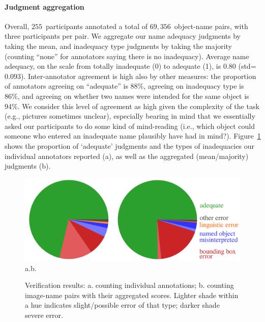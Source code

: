 \paragraph{Judgment aggregation}
Overall, $255$~participants annotated a total of $69,356$~object-name pairs, with three participants per pair.
We aggregate our name adequacy judgments by taking the mean, and inadequacy type judgments by taking the majority (counting ``none'' for annotators saying there is no inadequacy). 
Average name adequacy, on the scale from totally inadequate (0) to adequate (1), is 0.80 (\mbox{std=$0.093$}).
Inter-annotator agreement is high also by other measures: the proportion of annotators agreeing on ``adequate'' is 88\%, agreeing on inadequacy type is 86\%, and agreeing on whether two names were intended for the same object is 94\%.
We consider this level of agreement as high given the complexity of the task (e.g., pictures sometimes unclear), especially bearing in mind that we essentially asked our participants to do some kind of mind-reading (i.e., which object could someone who entered an inadequate name plausibly have had in mind?).
Figure~\ref{fig:verification-piechart} shows the proportion of `adequate' judgments and the types of inadequacies our individual annotators reported (a), as well as the aggregated (mean/majority) judgments (b).
\begin{figure}[t]
	\centering
	\includegraphics[width=\columnwidth]{images/verification_piechart_double.pdf}\\
	\hspace*{\fill}a.\hspace*{\fill}\hspace*{\fill}b.\hspace*{\fill}\hspace*{\fill}
	\caption{Verification results: a. counting individual annotations; b. counting image-name pairs with their aggregated scores. Lighter shade within a hue indicates slight/possible error of that type; darker shade severe error.}
	\label{fig:verification-piechart}
\end{figure}

